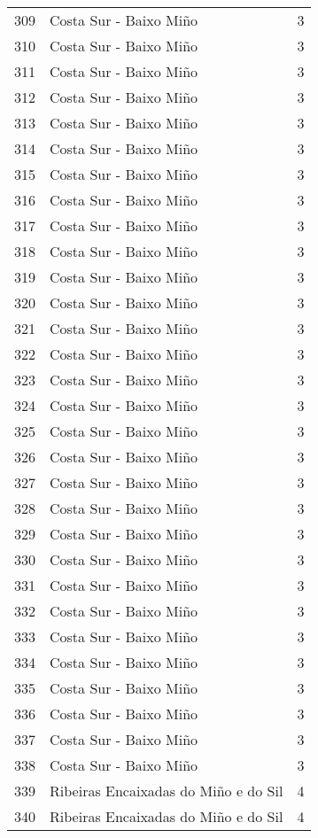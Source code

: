 \begin{table}[p]
\begin{tabular}{rlr}
  309 & Costa Sur - Baixo Miño &   3 \\ 
  310 & Costa Sur - Baixo Miño &   3 \\ 
  311 & Costa Sur - Baixo Miño &   3 \\ 
  312 & Costa Sur - Baixo Miño &   3 \\ 
  313 & Costa Sur - Baixo Miño &   3 \\ 
  314 & Costa Sur - Baixo Miño &   3 \\ 
  315 & Costa Sur - Baixo Miño &   3 \\ 
  316 & Costa Sur - Baixo Miño &   3 \\ 
  317 & Costa Sur - Baixo Miño &   3 \\ 
  318 & Costa Sur - Baixo Miño &   3 \\ 
  319 & Costa Sur - Baixo Miño &   3 \\ 
  320 & Costa Sur - Baixo Miño &   3 \\ 
  321 & Costa Sur - Baixo Miño &   3 \\ 
  322 & Costa Sur - Baixo Miño &   3 \\ 
  323 & Costa Sur - Baixo Miño &   3 \\ 
  324 & Costa Sur - Baixo Miño &   3 \\ 
  325 & Costa Sur - Baixo Miño &   3 \\ 
  326 & Costa Sur - Baixo Miño &   3 \\ 
  327 & Costa Sur - Baixo Miño &   3 \\ 
  328 & Costa Sur - Baixo Miño &   3 \\ 
  329 & Costa Sur - Baixo Miño &   3 \\ 
  330 & Costa Sur - Baixo Miño &   3 \\ 
  331 & Costa Sur - Baixo Miño &   3 \\ 
  332 & Costa Sur - Baixo Miño &   3 \\ 
  333 & Costa Sur - Baixo Miño &   3 \\ 
  334 & Costa Sur - Baixo Miño &   3 \\ 
  335 & Costa Sur - Baixo Miño &   3 \\ 
  336 & Costa Sur - Baixo Miño &   3 \\ 
  337 & Costa Sur - Baixo Miño &   3 \\ 
  338 & Costa Sur - Baixo Miño &   3 \\ 
  339 & Ribeiras Encaixadas do Miño e do Sil &   4 \\ 
  340 & Ribeiras Encaixadas do Miño e do Sil &   4 \\ 

\end{tabular}
\end{table}
